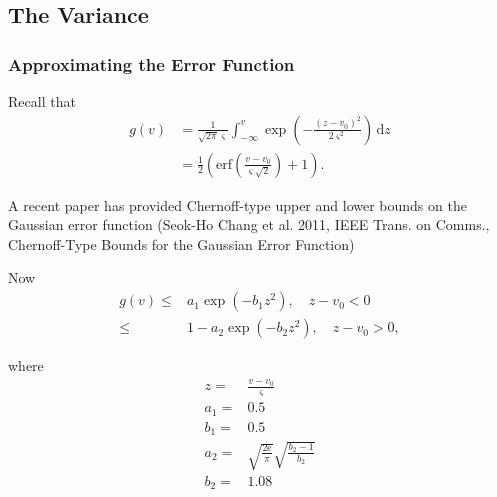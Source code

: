 \documentclass[]{article}
\begin{document}
\subsection{The Variance}


\subsubsection{Approximating the Error Function}

Recall that
\begin{align}
	g(v) &= \frac{1}{\sqrt{2\pi}\varsigma}\int_{-\infty}^{v}\exp\left(-\frac{(z-v_0)^2}{2\varsigma^2}\right)\,\mathrm{d}z \\
	&= \frac{1}{2}\left(\mathrm{erf}\left(\frac{v-v_0}{\varsigma\sqrt{2}}\right) + 1\right).
\end{align}

A recent paper has provided Chernoff-type upper and lower bounds on the Gaussian error function (Seok-Ho Chang et al. 2011, IEEE Trans. on Comms., Chernoff-Type Bounds for the Gaussian Error Function)

Now
\begin{align}
	g(v) \le& a_1\exp(-b_1z^2), \quad z-v_0<0 \\
	\le& 1-a_2\exp(-b_2z^2), \quad z-v_0>0,
\end{align}

where
\begin{align}
	z =& \frac{v-v_0}{\varsigma} \\ 
	a_1 =& 0.5 \\
	b_1 =& 0.5 \\
	a_2 =& \sqrt{\frac{2\mathrm{e}}{\pi}}\sqrt{\frac{b_2-1}{b_2}} \\
	b_2 =& 1.08
\end{align}
\end{document}
